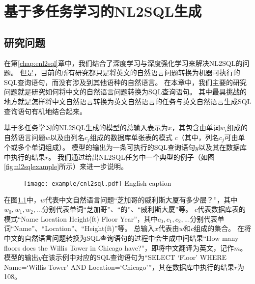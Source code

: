 
\chapter{基于多任务学习的NL2SQL生成}
\label{chap:cnl2sql}

\section{研究问题}

在第\ref{chap:enl2sql}章中，我们结合了深度学习与深度强化学习来解决NL2SQL的问题。
但是，目前的所有研究都只是将英文的自然语言问题转换为机器可执行的SQL查询语句，而没有涉及到其他语种的自然语言。
在本章中，我们主要的研究问题就是研究如何将中文的自然语言问题转换为SQL查询语句。
其中最具挑战的地方就是怎样将中文自然语言转换为英文自然语言的任务与英文自然语言生成SQL查询语句有机地结合起来。

基于多任务学习的NL2SQL生成的模型的总输入表示为$x$，其包含由单词$w_{i}$组成的自然语言问题$w$以及由列名$c_{j}$组成的数据库单张表的模式 $c$（其中，列名$c_{j}$可由单个或多个单词组成）。
模型的输出为一条可执行的SQL查询语句$y$以及其在数据库中执行的结果$r$。
我们通过给出NL2SQL任务中一个典型的例子（如图\ref{fig:nl2sqlexample}所示）来进一步说明。

\begin{figure}[!htp]
    \centering
    \texttt{[image: example/cnl2sql.pdf]}
      {English caption}
    \label{fig:cnl2sqlexample}
  \end{figure}

在图\ref{fig:cnl2sqlexample}中，$w$代表中文自然语言问题“芝加哥的威利斯大厦有多少层？”，其中$w_0,w_1,w_2,...$分别代表单词“芝加哥”、“的”、“威利斯大厦”等。
$c$代表数据库表的模式“Name Location Height(ft) Floor Year”，其中$c_0,c_1,c_2,...$分别代表单词“Name”、“Location”、“Height(ft)”等。
总输入$x$代表由$w$和$c$组成的集合。
在将中文的自然语言问题转换为SQL查询语句的过程中会生成中间结果“How  many  floors  does  the  Willis  Tower  in  Chicago  have?”，即将中文翻译为英文，记作$m$。
模型的输出$y$在该示例中对应的SQL查询语句为“SELECT ‘Floor’ WHERE Name=‘Willis Tower’ AND Location=‘Chicago’”，其在数据库中执行的结果$r$为108。

